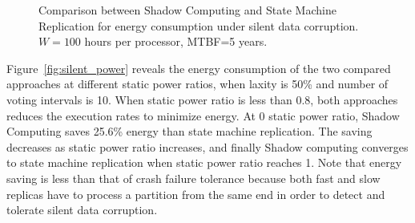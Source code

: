 \begin{figure}[!t]
	\begin{center}
	\end{center}
	\caption{Comparison between Shadow Computing and State Machine Replication for energy consumption under silent data corruption. $W=100$ hours per processor, MTBF=5 years.}
	\label{fig:silent_eval}
\end{figure}

Figure~\ref{fig:silent_power} reveals the energy consumption of the two compared approaches at different static power ratios, when laxity is 50\% and number of voting intervals is 10. When static power ratio is less than 0.8, both approaches reduces the execution rates to minimize energy. At 0 static power ratio, Shadow Computing saves 25.6\% energy than state machine replication. The saving decreases as static power ratio increases, and finally Shadow computing converges to state machine replication when static power ratio reaches 1. Note that energy saving is less than that of crash failure tolerance because both fast and slow replicas have to process a partition from the same end in order to detect and tolerate silent data corruption.

